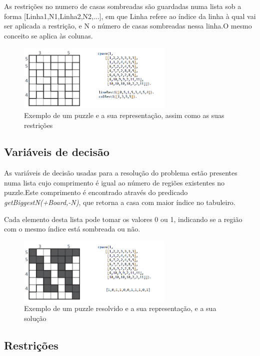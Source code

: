\documentclass[runningheads,a4paper,12pt]{llncs}
\begin{document}
As restrições no numero de casas sombreadas são guardadas numa lista sob a forma [Linha1,N1,Linha2,N2,...], em que Linha refere ao índice da linha à qual vai ser aplicada a restrição, e N o número de casas sombreadas nessa linha.O mesmo conceito se aplica às colunas.

\begin{figure}
\centering
\includegraphics[height=3.2cm]{exemplo2.png}
\caption{Exemplo de um puzzle e a sua representação, assim como as suas restrições} 
\label{fig:crazypavementexandsol}
\end{figure}

\subsection{Variáveis de decisão}

As variáveis de decisão usadas para a resolução do problema estão presentes numa lista cujo comprimento é igual ao número de regiões existentes no puzzle.Este comprimento é encontrado através do predicado \textit{getBiggestN(+Board,-N)}, que retorna a casa com maior índice no tabuleiro.

Cada elemento desta lista pode tomar os valores 0 ou 1, indicando se a região com o mesmo índice está sombreada ou não.
\begin{figure}
\centering
\includegraphics[height=3.2cm]{exemplo3.png}
\caption{Exemplo de um puzzle resolvido e a sua representação, e a sua solução} 
\label{fig:crazypavementexandsol}
\end{figure}

\newpage

\subsection{Restrições}
\end{document}
